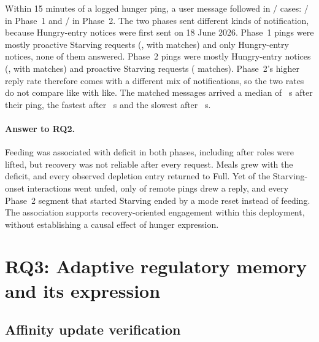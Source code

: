 Within 15 minutes of a logged hunger ping, a user message followed in \CoreTelegramMessages{}/\CoreTelegramPings{} cases: \CorePOneMessages{}/\CorePOnePings{} in Phase~1 and \CorePTwoMessages{}/\CorePTwoPings{} in Phase~2. The two phases sent different kinds of notification, because Hungry-entry notices were first sent on 18 June 2026. Phase~1 pings were mostly proactive Starving requests (\CorePOneStarvingProactivePings{}, with \CorePOneStarvingProactiveMessages{} matches) and only \CorePOneHungryEntryPings{} Hungry-entry notices, none of them answered. Phase~2 pings were mostly Hungry-entry notices (\CorePTwoHungryEntryPings{}, with \CorePTwoHungryEntryMessages{} matches) and \CorePTwoStarvingProactivePings{} proactive Starving requests (\CorePTwoStarvingProactiveMessages{} matches). Phase~2's higher reply rate therefore comes with a different mix of notifications, so the two rates do not compare like with like. The \CoreTelegramMessages{} matched messages arrived a median of \CoreTelegramLatencyMedian{}~s after their ping, the fastest after \CoreTelegramLatencyMin{}~s and the slowest after \CoreTelegramLatencyMax{}~s.

\paragraph{Answer to RQ2.} Feeding was associated with deficit in both phases, including after roles were lifted, but recovery was not reliable after every request. Meals grew with the deficit, and every observed depletion entry returned to Full. Yet \CoreStarvingOnsetUnfed{} of the \CoreStarvingInteractions{} Starving-onset interactions went unfed, only \CoreTelegramMessages{} of \CoreTelegramPings{} remote pings drew a reply, and every Phase~2 segment that started Starving ended by a mode reset instead of feeding. The association supports recovery-oriented engagement within this deployment, without establishing a causal effect of hunger expression.

\section{RQ3: Adaptive regulatory memory and its expression}
\label{subsec:results-rq3}

\subsection{Affinity update verification}

